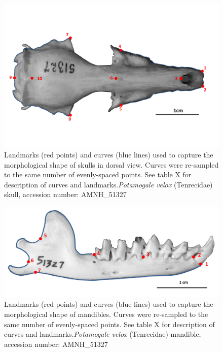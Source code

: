 \documentclass[12pt,a4paper]{article}
\begin{document}
\begin{figure}
\centering
\includegraphics[width=1\linewidth]{figures/AMNH_51327_dorsallandmarksdiagram.png}
\caption{Landmarks (red points) and curves (blue lines) used to capture the morphological shape of skulls in dorsal view. Curves were re-sampled to the same number of evenly-spaced points. See table X for description of curves and landmarks.\textit{Potamogale velox} (Tenrecidae) skull, accession number: AMNH\_51327}
\label{fig:skdors_landmarks}
\end{figure}


\begin{table}[H]			
\centering
\caption{Descriptions of the landmarks (points) and curves (semilandmarks) for the skulls in dorsal view (see Figure \ref{fig:skdors_landmarks}).}
\label{tab:skdors_landmarks}  
\end{table}
\begin{figure}[H]
\centering
\includegraphics[width=1\linewidth]{figures/AMNH_51327_landmarksdiagram.png}

\caption{Landmarks (red points) and curves (blue lines) used to capture the morphological shape of mandibles. Curves were re-sampled to the same number of evenly-spaced points. See table X for description of curves and landmarks.\textit{Potamogale velox} (Tenrecidae) mandible, accession number: AMNH\_51327}
\label{fig:mands_landmarks}
\end{figure}
\end{document}
